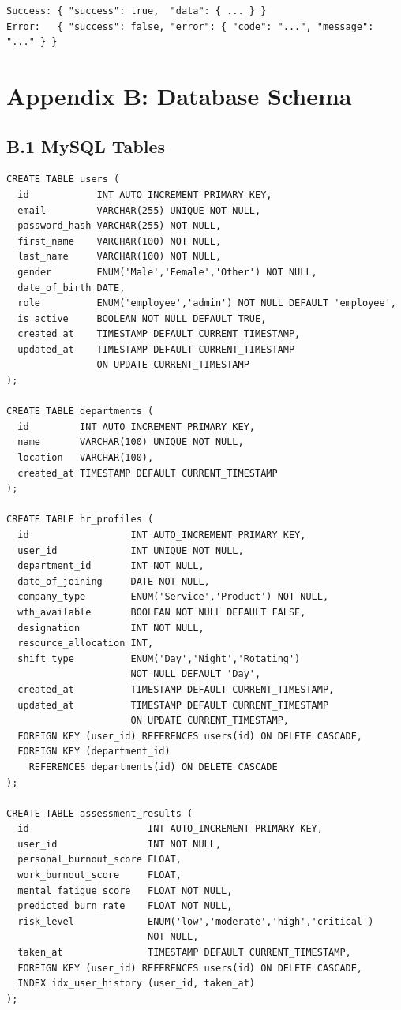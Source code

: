 \documentclass[12pt,a4paper]{article}
\begin{document}
\begin{verbatim}
Success: { "success": true,  "data": { ... } }
Error:   { "success": false, "error": { "code": "...", "message": "..." } }
\end{verbatim}

\newpage
\section*{Appendix B: Database Schema}

\subsection*{B.1 MySQL Tables}

\begin{verbatim}
CREATE TABLE users (
  id            INT AUTO_INCREMENT PRIMARY KEY,
  email         VARCHAR(255) UNIQUE NOT NULL,
  password_hash VARCHAR(255) NOT NULL,
  first_name    VARCHAR(100) NOT NULL,
  last_name     VARCHAR(100) NOT NULL,
  gender        ENUM('Male','Female','Other') NOT NULL,
  date_of_birth DATE,
  role          ENUM('employee','admin') NOT NULL DEFAULT 'employee',
  is_active     BOOLEAN NOT NULL DEFAULT TRUE,
  created_at    TIMESTAMP DEFAULT CURRENT_TIMESTAMP,
  updated_at    TIMESTAMP DEFAULT CURRENT_TIMESTAMP
                ON UPDATE CURRENT_TIMESTAMP
);

CREATE TABLE departments (
  id         INT AUTO_INCREMENT PRIMARY KEY,
  name       VARCHAR(100) UNIQUE NOT NULL,
  location   VARCHAR(100),
  created_at TIMESTAMP DEFAULT CURRENT_TIMESTAMP
);

CREATE TABLE hr_profiles (
  id                  INT AUTO_INCREMENT PRIMARY KEY,
  user_id             INT UNIQUE NOT NULL,
  department_id       INT NOT NULL,
  date_of_joining     DATE NOT NULL,
  company_type        ENUM('Service','Product') NOT NULL,
  wfh_available       BOOLEAN NOT NULL DEFAULT FALSE,
  designation         INT NOT NULL,
  resource_allocation INT,
  shift_type          ENUM('Day','Night','Rotating')
                      NOT NULL DEFAULT 'Day',
  created_at          TIMESTAMP DEFAULT CURRENT_TIMESTAMP,
  updated_at          TIMESTAMP DEFAULT CURRENT_TIMESTAMP
                      ON UPDATE CURRENT_TIMESTAMP,
  FOREIGN KEY (user_id) REFERENCES users(id) ON DELETE CASCADE,
  FOREIGN KEY (department_id)
    REFERENCES departments(id) ON DELETE CASCADE
);

CREATE TABLE assessment_results (
  id                     INT AUTO_INCREMENT PRIMARY KEY,
  user_id                INT NOT NULL,
  personal_burnout_score FLOAT,
  work_burnout_score     FLOAT,
  mental_fatigue_score   FLOAT NOT NULL,
  predicted_burn_rate    FLOAT NOT NULL,
  risk_level             ENUM('low','moderate','high','critical')
                         NOT NULL,
  taken_at               TIMESTAMP DEFAULT CURRENT_TIMESTAMP,
  FOREIGN KEY (user_id) REFERENCES users(id) ON DELETE CASCADE,
  INDEX idx_user_history (user_id, taken_at)
);


\end{verbatim}
\end{document}
